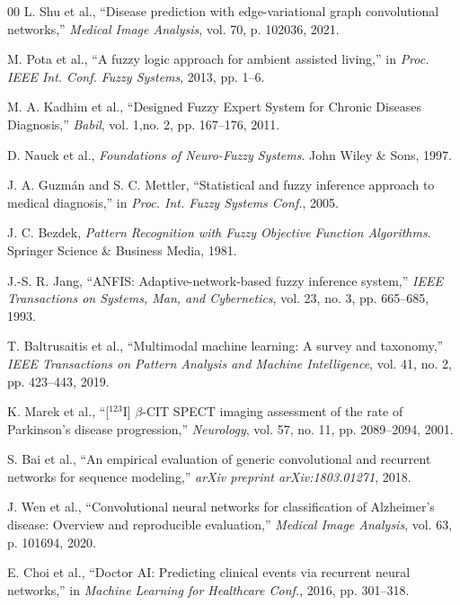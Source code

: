 \documentclass[conference]{IEEEtran}
\begin{document}
\begin{thebibliography}{00}
L. Shu et al., ``Disease prediction with edge-variational graph convolutional networks,'' \textit{Medical Image Analysis}, vol. 70, p. 102036, 2021.

M. Pota et al., ``A fuzzy logic approach for ambient assisted living,'' in \textit{Proc. IEEE Int. Conf. Fuzzy Systems}, 2013, pp. 1--6.

M. A. Kadhim et al., ``Designed Fuzzy Expert System for Chronic Diseases Diagnosis,'' \textit{Babil}, vol. 1,no. 2, pp. 167--176, 2011.

D. Nauck et al., \textit{Foundations of Neuro-Fuzzy Systems}. John Wiley \& Sons, 1997.

J. A. Guzmán and S. C. Mettler, ``Statistical and fuzzy inference approach to medical diagnosis,'' in \textit{Proc. Int. Fuzzy Systems Conf.}, 2005.

J. C. Bezdek, \textit{Pattern Recognition with Fuzzy Objective Function Algorithms}. Springer Science \& Business Media, 1981.

J.-S. R. Jang, ``ANFIS: Adaptive-network-based fuzzy inference system,'' \textit{IEEE Transactions on Systems, Man, and Cybernetics}, vol. 23, no. 3, pp. 665--685, 1993.

T. Baltrusaitis et al., ``Multimodal machine learning: A survey and taxonomy,'' \textit{IEEE Transactions on Pattern Analysis and Machine Intelligence}, vol. 41, no. 2, pp. 423--443, 2019.

K. Marek et al., ``[$^{123}$I] $\beta$-CIT SPECT imaging assessment of the rate of Parkinson's disease progression,'' \textit{Neurology}, vol. 57, no. 11, pp. 2089--2094, 2001.

S. Bai et al., ``An empirical evaluation of generic convolutional and recurrent networks for sequence modeling,'' \textit{arXiv preprint arXiv:1803.01271}, 2018.

J. Wen et al., ``Convolutional neural networks for classification of Alzheimer's disease: Overview and reproducible evaluation,'' \textit{Medical Image Analysis}, vol. 63, p. 101694, 2020.

E. Choi et al., ``Doctor AI: Predicting clinical events via recurrent neural networks,'' in \textit{Machine Learning for Healthcare Conf.}, 2016, pp. 301--318.


\end{thebibliography}
\end{document}
